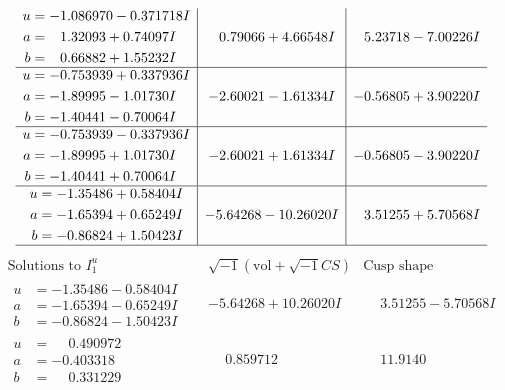 \documentclass[1p]{elsarticle_modified}
\theoremstyle{definition}
\newcommand{\I}{\sqrt{-1}}
\begin{document}
$$\begin{array}{c|c|c}
\begin{aligned}
u &= -1.086970 - 0.371718 I \\
a &= \phantom{-}1.32093 + 0.74097 I \\
b &= \phantom{-}0.66882 + 1.55232 I\end{aligned}
 & \phantom{-}0.79066 + 4.66548 I & \phantom{-}5.23718 - 7.00226 I \\ \hline\begin{aligned}
u &= -0.753939 + 0.337936 I \\
a &= -1.89995 - 1.01730 I \\
b &= -1.40441 - 0.70064 I\end{aligned}
 & -2.60021 - 1.61334 I & -0.56805 + 3.90220 I \\ \hline\begin{aligned}
u &= -0.753939 - 0.337936 I \\
a &= -1.89995 + 1.01730 I \\
b &= -1.40441 + 0.70064 I\end{aligned}
 & -2.60021 + 1.61334 I & -0.56805 - 3.90220 I \\ \hline\begin{aligned}
u &= -1.35486 + 0.58404 I \\
a &= -1.65394 + 0.65249 I \\
b &= -0.86824 + 1.50423 I\end{aligned}
 & -5.64268 - 10.26020 I & \phantom{-}3.51255 + 5.70568 I\\
 \hline 
 \end{array}$$\newpage$$\begin{array}{c|c|c}  
\text{Solutions to }I^u_{1}& \I (\text{vol} + \sqrt{-1}CS) & \text{Cusp shape}\\
 \hline 
\begin{aligned}
u &= -1.35486 - 0.58404 I \\
a &= -1.65394 - 0.65249 I \\
b &= -0.86824 - 1.50423 I\end{aligned}
 & -5.64268 + 10.26020 I & \phantom{-}3.51255 - 5.70568 I \\ \hline\begin{aligned}
u &= \phantom{-}0.490972\phantom{ +0.000000I} \\
a &= -0.403318\phantom{ +0.000000I} \\
b &= \phantom{-}0.331229\phantom{ +0.000000I}\end{aligned}
 & \phantom{-}0.859712\phantom{ +0.000000I} & \phantom{-}11.9140\phantom{ +0.000000I} \\ \hline\begin{aligned}

\end{aligned}
\end{array}$$
\end{document}
